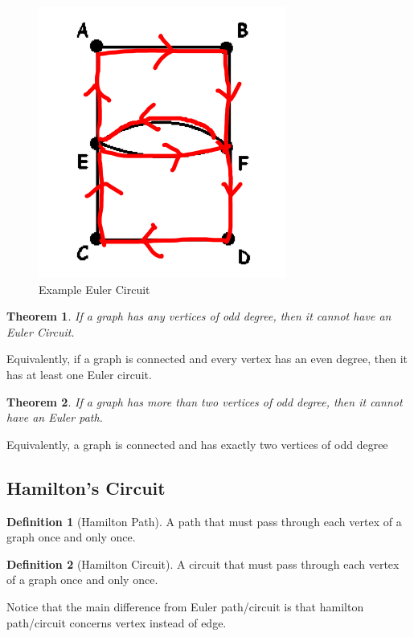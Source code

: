 \documentclass{article}
\theoremstyle{plain}%
\newtheorem{thm}{Theorem}[section]
\theoremstyle{definition}
\newtheorem{defn}{Definition}[section]
\theoremstyle{remark}
\begin{document}
	\begin{figure}[htbp]
		\center
		\includegraphics[scale=0.4]{img/euler-circuit.png}
		\caption{Example Euler Circuit}
		\label{fig-example-euler-circuit}
	\end{figure}

	\begin{thm}
		If a graph has any vertices of odd degree, then it cannot have an Euler Circuit.
	\end{thm}
	
	Equivalently, if a graph is connected and every vertex has an even degree, then it has at least one Euler circuit.

	\begin{thm}
		If a graph has more than two vertices of odd degree, then it cannot have an Euler path.
	\end{thm}

	Equivalently, a graph is connected and has exactly two vertices of odd degree 

	\subsection{Hamilton's Circuit}

	\begin{defn}[Hamilton Path]
		A path that must pass through each vertex of a graph once and only once.
	\end{defn}

	\begin{defn}[Hamilton Circuit]
		A circuit that must pass through each vertex of a graph once and only once.
	\end{defn}

	Notice that the main difference from Euler path/circuit is that hamilton path/circuit concerns vertex instead of edge.
\end{document}
